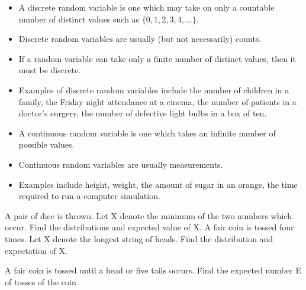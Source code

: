 \documentclass[12pt]{report}
\begin{document}
{ \Large
	\begin{itemize}
		\item A discrete random variable is one which may take on only a countable number of distinct values such as $\{0, 1, 2, 3, 4, ... \}$.\item Discrete random variables are usually (but not necessarily) counts. \item If a random variable can take only a finite number of distinct values, then it must be discrete. \item Examples of discrete random variables include the number of children in a family, the Friday night attendance at a cinema, the number of patients in a doctor's surgery, the number of defective light bulbs in a box of ten.
	\end{itemize}
}


{ \Large
	\begin{itemize} \item
		A continuous random variable is one which takes an infinite number of possible values. \item Continuous random variables are usually measurements. \item Examples include height, weight, the amount of sugar in an orange, the time required to run a computer simulation. \end{itemize}
	
}
	
	
	A pair of dice is thrown. Let X denote the minimum of the two numbers which occur.
	Find the distributions and expected value of X.
		A fair coin is tossed four times.
	Let X denote the longest string of heads.
	Find the distribution and expectation of X.

A fair coin is tossed until a head or five tails occurs.
	Find the expected number E of tosses of the coin.
	
\end{document}
